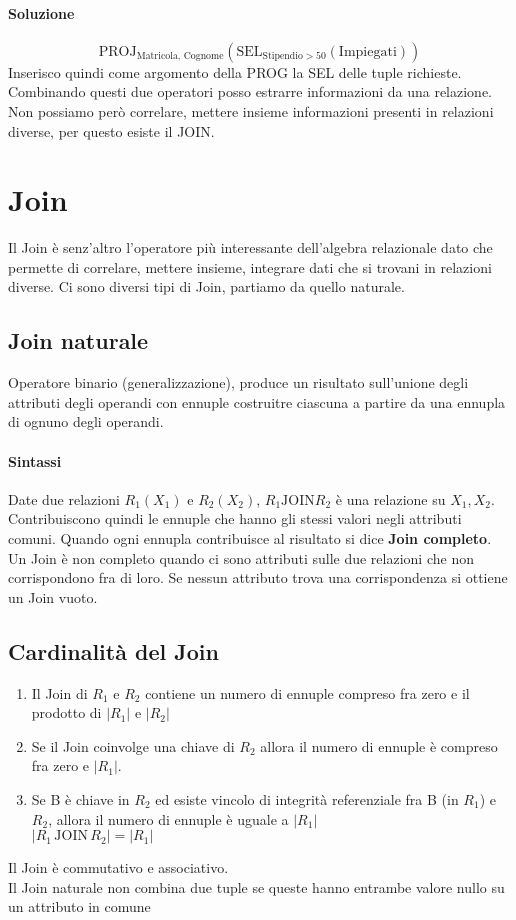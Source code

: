 \paragraph*{Soluzione}
\begin{equation*}
    \text{PROJ}_{\text{Matricola, Cognome}}(\text{SEL}_{\text{Stipendio} > 50}(\text{Impiegati}))
\end{equation*}
Inserisco quindi come argomento della PROG la SEL delle tuple richieste. Combinando questi due
operatori posso estrarre informazioni da una relazione. Non possiamo però correlare,
mettere insieme informazioni presenti in relazioni diverse, per questo esiste il JOIN.

\section{Join}
Il Join è senz'altro l'operatore più interessante dell'algebra relazionale dato che permette
di correlare, mettere insieme, integrare dati che si trovani in relazioni diverse. Ci sono
diversi tipi di Join, partiamo da quello naturale.
\subsection*{Join naturale}
Operatore binario (generalizzazione), produce un risultato sull'unione degli attributi
degli operandi con ennuple costruitre ciascuna a partire da una ennupla di ognuno degli operandi.
\paragraph*{Sintassi} Date due relazioni $R_1(X_1)$ e $R_2(X_2)$, $R_1 \text{JOIN} R_2$ è una
relazione su $X_1, X_2$. Contribuiscono quindi le ennuple che hanno gli stessi valori negli attributi
comuni. Quando ogni ennupla contribuisce al risultato si dice \textbf{Join completo}.\\
Un Join è non completo quando ci sono attributi sulle due relazioni che non corrispondono fra di loro. Se
nessun attributo trova una corrispondenza si ottiene un Join vuoto.
\subsection*{Cardinalità del Join}
\begin{enumerate}
    \item Il Join di $R_1$ e $R_2$ contiene un numero di ennuple compreso fra zero e il prodotto di $|R_1|$
    e $|R_2|$
    \item Se il Join coinvolge una chiave di $R_2$ allora il numero di ennuple è compreso fra zero e $|R_1|$.
    \item Se B è chiave in $R_2$ ed esiste vincolo di integrità referenziale fra
    B (in $R_1$) e $R_2$, allora il numero di ennuple è uguale a $|R_1|$\\ $|R_1 \,\text{JOIN}\, R_2| = |R_1|$
\end{enumerate}
Il Join è commutativo e associativo.\\
Il Join naturale non combina due tuple se queste hanno entrambe valore nullo su un attributo in
comune
 